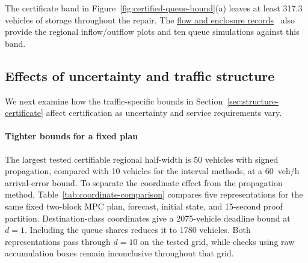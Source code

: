 \documentclass[preprint,12pt]{elsarticle}
\theoremstyle{definition}
\theoremstyle{plain}
\theoremstyle{definition}
\theoremstyle{plain}
\newcommand{\reproductiondetails}[1]{\href{https://github.com/AlienEslami/agentic-perimeter-runtime-certification/releases/tag/paper-2026-11-10}{#1}~\cite{perimeterReproductionGuide}}
\begin{document}
The certificate band in Figure~\ref{fig:certified-queue-bound}(a)
leaves at least 317.3 vehicles of storage throughout the repair.
The \reproductiondetails{flow and enclosure records} also provide the
regional inflow/outflow plots and ten queue simulations against this band.



\subsection{Effects of uncertainty and traffic structure}
\label{sec:structure-results}
\label{sec:structure-online}
\label{sec:uncertainty-results}

We next examine how the traffic-specific bounds in
Section~\ref{sec:structure-certificate} affect certification as uncertainty
and service requirements vary.

\paragraph{Tighter bounds for a fixed plan}
The largest tested certifiable regional half-width is 50 vehicles with
signed propagation, compared with 10 vehicles for the interval methods,
at a 60~veh/h arrival-error bound. To separate the coordinate effect
from the propagation method, Table~\ref{tab:coordinate-comparison} compares
five representations for the same fixed two-block MPC plan, forecast,
initial state, and 15-second proof partition. Destination-class coordinates
give a 2075-vehicle deadline bound at $d=1$. Including the queue shares
reduces it to 1780 vehicles. Both representations pass through $d=10$ on
the tested grid, while checks using raw accumulation boxes remain inconclusive throughout
that grid.
\end{document}
